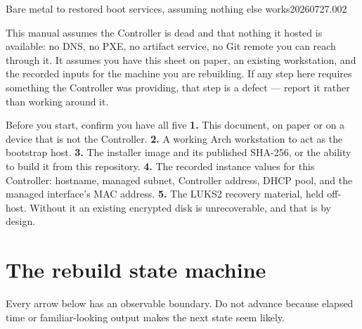 


  {Bare metal to restored boot services, assuming nothing else works}{20260727.002}

\newcommand{\rebuildcaption}[1]{\par\smallskip{\centering\footnotesize\itshape #1\par}}



This manual assumes the Controller is dead and that nothing it hosted is
available: no DNS, no PXE, no artifact service, no Git remote you can reach
through it. It assumes you have this sheet on paper, an existing workstation,
and the recorded inputs for the machine you are rebuilding. If any step here
requires something the Controller was providing, that step is a defect --- report
it rather than working around it.

\begin{gate}{Before you start, confirm you have all five}
\textbf{1.} This document, on paper or on a device that is not the Controller.
\textbf{2.} A working Arch workstation to act as the bootstrap host.
\textbf{3.} The installer image and its published SHA-256, or the ability to
build it from this repository.
\textbf{4.} The recorded instance values for this Controller: hostname, managed
subnet, Controller address, DHCP pool, and the managed interface's MAC address.
\textbf{5.} The LUKS2 recovery material, held off-host. Without it an existing
encrypted disk is unrecoverable, and that is by design.
\end{gate}

\section{The rebuild state machine}
Every arrow below has an observable boundary. Do not advance because elapsed
time or familiar-looking output makes the next state seem likely.

